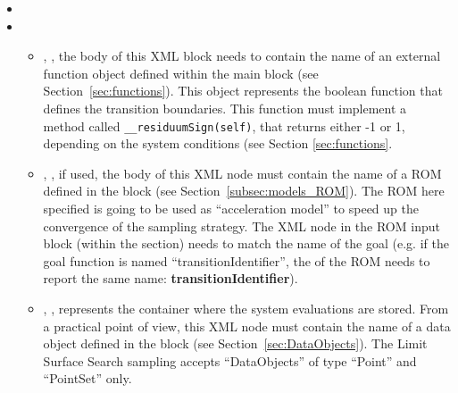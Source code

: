 \begin{itemize}
  \item \convergenceDescription

  \item {}
    \begin{itemize}
      \item {}, ,  the
        body of this XML block needs to contain the name of an external
        function object defined within the  main block (see
        Section~\ref{sec:functions}).
        This object represents the boolean function that defines the transition
        boundaries.
        This function must implement a method called
        \texttt{\_\_residuumSign(self)}, that returns either -1 or 1, depending
        on the system conditions (see Section \ref{sec:functions}.
      \item {}, , if used, the
        body of this XML node must contain the name of a ROM defined in the
         block (see Section~\ref{subsec:models_ROM}). The ROM
        here specified is going to be used as ``acceleration model'' to speed up the
        convergence of the sampling strategy. The  XML node in the ROM
        input block (within the  section) needs to match the name of the goal
         (e.g. if the goal function is named ``transitionIdentifier'', the  of the
        ROM needs to report the same name: \textbf{transitionIdentifier}).
      \item {}, ,
        represents the container where the system evaluations are stored.
        From a practical point of view, this XML node must contain the name of
        a data object defined in the  block (see
        Section~\ref{sec:DataObjects}).
        The Limit Surface Search sampling accepts ``DataObjects'' of type ``Point'' and
        ``PointSet'' only.
    \end{itemize}
\end{itemize}

